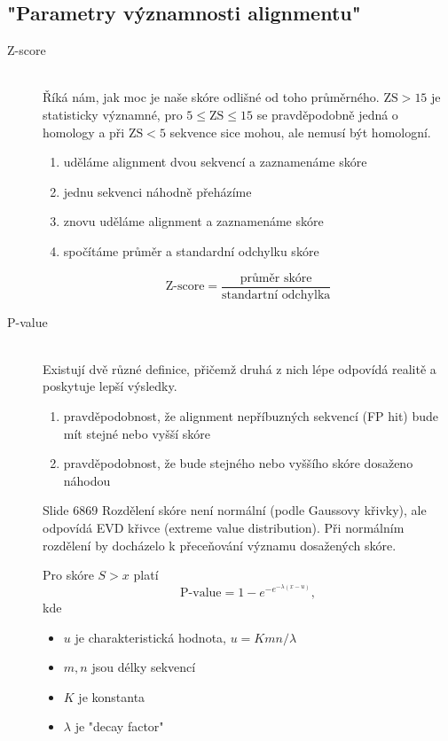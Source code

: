 \documentclass[DIV=8]{scrreprt}
\begin{document}
\subsection{"Parametry významnosti alignmentu"}

\begin{description}
\item[Z-score]\hfill \\
Říká nám, jak moc je naše skóre odlišné od toho průměrného. \(\text{ZS} > 15\) je statisticky významné, pro \(5 \leq \text{ZS} \leq 15\) se pravděpodobně jedná o homology a při \(\text{ZS} < 5\) sekvence sice mohou, ale nemusí být homologní.

\begin{enumerate}
    \item uděláme alignment dvou sekvencí a zaznamenáme skóre
    \item jednu sekvenci náhodně přeházíme
    \item znovu uděláme alignment a zaznamenáme skóre
    \item spočítáme průměr a standardní odchylku skóre
\end{enumerate}


\[\text{Z-score} = \frac{\text{průměr skóre}}{\text{standartní odchylka}}\]


\item[P-value]\hfill \\
Existují dvě různé definice, přičemž druhá z nich lépe odpovídá realitě a poskytuje lepší výsledky.
\begin{enumerate}
    \item pravděpodobnost, že alignment nepříbuzných sekvencí (FP hit) bude mít stejné nebo vyšší skóre
    \item pravděpodobnost, že bude stejného nebo vyššího skóre dosaženo náhodou
\end{enumerate}


Slide 6869
Rozdělení skóre není normální (podle Gaussovy křivky), ale odpovídá EVD křivce (extreme value distribution). Při normálním rozdělení by docházelo k přeceňování významu dosažených skóre.

Pro skóre \(S > x\) platí
\[\text{P-value} = 1 - e^{-e^{-\lambda (x - u)}},\]
kde
\begin{itemize}
    \item \(u\) je charakteristická hodnota, \(u = Kmn / \lambda\)
    \item \(m, n\) jsou délky sekvencí
    \item \(K\) je konstanta
    \item \(\lambda\) je "decay factor"
\end{itemize}


\end{description}
\end{document}
